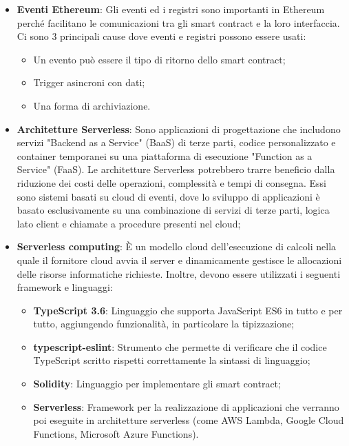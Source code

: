 \begin{itemize}
\item \textbf{Eventi Ethereum}: Gli eventi ed i registri sono importanti in Ethereum perché facilitano le comunicazioni tra gli smart contract e la loro interfaccia.
Ci sono 3 principali cause dove eventi e registri possono essere usati:
\begin{itemize}
\item Un evento può essere il tipo di ritorno dello smart contract;
\item Trigger asincroni con dati;
\item Una forma di archiviazione.
\end{itemize}

\item \textbf{Architetture Serverless}: Sono applicazioni di progettazione che includono servizi "Backend as a Service" (BaaS) di terze parti, codice personalizzato e container temporanei su una piattaforma di esecuzione "Function as a Service" (FaaS). Le architetture Serverless potrebbero trarre beneficio dalla riduzione dei costi delle operazioni, complessità e tempi di consegna. Essi sono sistemi basati su cloud di eventi, dove lo sviluppo di applicazioni è basato esclusivamente su una combinazione di servizi di terze parti, logica lato client e chiamate a procedure presenti nel cloud;
\item \textbf{Serverless computing}: È un modello cloud dell'esecuzione di calcoli nella quale il fornitore cloud avvia il server e dinamicamente gestisce le allocazioni delle risorse informatiche richieste.
Inoltre, devono essere utilizzati i seguenti framework e linguaggi:
\begin{itemize}
\item \textbf{TypeScript 3.6}: Linguaggio che supporta JavaScript ES6 in tutto e per tutto, aggiungendo funzionalità, in particolare la tipizzazione;
\item \textbf{typescript-eslint}: Strumento che permette di verificare che il codice TypeScript scritto rispetti correttamente la sintassi di linguaggio;
\item \textbf{Solidity}: Linguaggio per implementare gli smart contract;
\item \textbf{Serverless}: Framework per la realizzazione di applicazioni che verranno poi eseguite in architetture serverless (come AWS Lambda, Google Cloud Functions, Microsoft Azure Functions).
\end{itemize}

\end{itemize}

